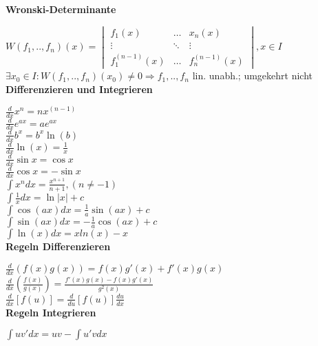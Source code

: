 \documentclass[10pt,twocolumn,a4paper]{article}
\begin{document}
\begin{flushleft}
\textbf{Wronski-Determinante}

$ W(f_1,..,f_n)(x) =
\begin{vmatrix}
    f_{1}(x) & \dots  & x_{n}(x) \\
    \vdots & \ddots & \vdots \\
    f_{1}^{(n-1)}(x) & \dots & f_n^{(n-1)}(x)
\end{vmatrix}, x \in I
$\\
$\exists x_0 \in I: W(f_1,..,f_n)(x_0) \neq 0 \Rightarrow f_1,..,f_n$ lin. unabh.; umgekehrt nicht\\

\textbf{Differenzieren und Integrieren}

$\frac{d}{{dx}}x^n  = nx^{\left( {n - 1} \right)}$\\
$\frac{d}{{dx}}e^{ax}  = ae^{ax}$\\
$\frac{d}{{dx}}b^x  = b^x \ln \left( b \right)$\\
$\frac{d}{{dx}}\ln \left( x \right) = \frac{1}{x}$\\
$\frac{d}{{dx}}\sin x = \cos x$\\
$\frac{d}{{dx}}\cos x =  - \sin x$\\

$\int {x^n } dx = \frac{{x^{n + 1} }}{{n + 1}},(n \ne  - 1)$\\
$\int {\frac{1}{x}} dx = \ln \left| x \right| + c$\\
$\int {\cos (ax)} dx = \frac{1}{a}\sin (ax) + c$\\
$\int {\sin (ax)} dx =  - \frac{1}{a}\cos (ax) + c$\\
$\int {\ln (x)} dx = x ln(x) -x$\\

\textbf{Regeln Differenzieren}

$\frac{d}{{dx}}\left( {f\left( x \right)g\left( x \right)} \right) = f\left( x \right)g'\left( x \right) + f'\left( x \right)g\left( x \right)$\\
$\frac{d}{{dx}}\left( {\frac{{f\left( x \right)}}{{g\left( x \right)}}} \right) = \frac{{f'\left( x \right)g\left( x \right) - f\left( x \right)g'\left( x \right)}}{{g^2 \left( x \right)}}$\\
$\frac{d}{{dx}}\left[ {f\left( u \right)} \right] = \frac{d}{{du}}\left[ {f\left( u \right)} \right]\frac{{du}}{{dx}}$\\

\textbf{Regeln Integrieren}

$\int {uv'} dx = uv - \int {u'v}dx$\\


\end{flushleft}
\end{document}
